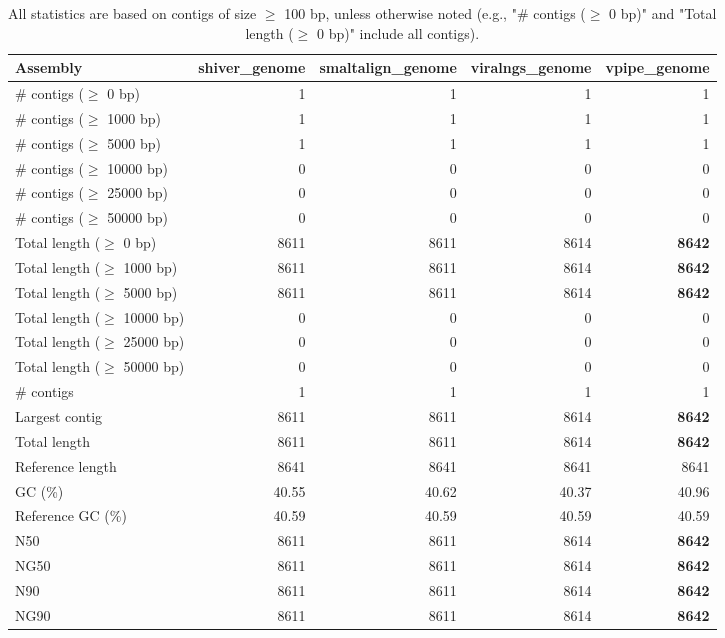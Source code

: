 \documentclass[12pt,a4paper]{article}
\begin{document}
\begin{table}[ht]
\begin{center}
\caption{All statistics are based on contigs of size $\geq$ 100 bp, unless otherwise noted (e.g., "\# contigs ($\geq$ 0 bp)" and "Total length ($\geq$ 0 bp)" include all contigs).}
\begin{tabular}{|l*{4}{|r}|}
\hline
Assembly & shiver\_genome & smaltalign\_genome & viralngs\_genome & vpipe\_genome \\ \hline
\# contigs ($\geq$ 0 bp) & 1 & 1 & 1 & 1 \\ \hline
\# contigs ($\geq$ 1000 bp) & 1 & 1 & 1 & 1 \\ \hline
\# contigs ($\geq$ 5000 bp) & 1 & 1 & 1 & 1 \\ \hline
\# contigs ($\geq$ 10000 bp) & 0 & 0 & 0 & 0 \\ \hline
\# contigs ($\geq$ 25000 bp) & 0 & 0 & 0 & 0 \\ \hline
\# contigs ($\geq$ 50000 bp) & 0 & 0 & 0 & 0 \\ \hline
Total length ($\geq$ 0 bp) & 8611 & 8611 & 8614 & {\bf 8642} \\ \hline
Total length ($\geq$ 1000 bp) & 8611 & 8611 & 8614 & {\bf 8642} \\ \hline
Total length ($\geq$ 5000 bp) & 8611 & 8611 & 8614 & {\bf 8642} \\ \hline
Total length ($\geq$ 10000 bp) & 0 & 0 & 0 & 0 \\ \hline
Total length ($\geq$ 25000 bp) & 0 & 0 & 0 & 0 \\ \hline
Total length ($\geq$ 50000 bp) & 0 & 0 & 0 & 0 \\ \hline
\# contigs & 1 & 1 & 1 & 1 \\ \hline
Largest contig & 8611 & 8611 & 8614 & {\bf 8642} \\ \hline
Total length & 8611 & 8611 & 8614 & {\bf 8642} \\ \hline
Reference length & 8641 & 8641 & 8641 & 8641 \\ \hline
GC (\%) & 40.55 & 40.62 & 40.37 & 40.96 \\ \hline
Reference GC (\%) & 40.59 & 40.59 & 40.59 & 40.59 \\ \hline
N50 & 8611 & 8611 & 8614 & {\bf 8642} \\ \hline
NG50 & 8611 & 8611 & 8614 & {\bf 8642} \\ \hline
N90 & 8611 & 8611 & 8614 & {\bf 8642} \\ \hline
NG90 & 8611 & 8611 & 8614 & {\bf 8642} \\ \hline

\end{tabular}
\end{center}
\end{table}
\end{document}
